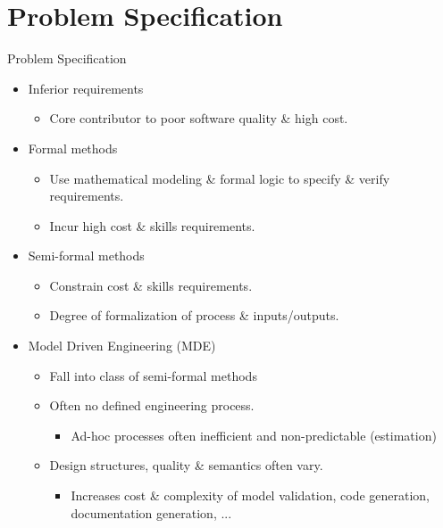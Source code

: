 \section{Problem Specification}

\begin{frame}{Problem Specification}
\initclock

  \begin{itemize}
    \item<alert@+> Inferior requirements
      \begin{itemize}
      	\item Core contributor to poor software quality \& high cost.
      \end{itemize}
    \item<alert@+> Formal methods
      \begin{itemize}
	      \item Use mathematical modeling \& formal logic to specify \& verify requirements.
    	  \item Incur high cost \& skills requirements.
      \end{itemize}
    \item<alert@+> Semi-formal methods
      \begin{itemize}
		\item Constrain cost \& skills requirements.
		\item Degree of formalization of process \& inputs/outputs.
	  \end{itemize}
   \item<alert@+> Model Driven Engineering (MDE)
   	  \begin{itemize}
   	  	\item Fall into class of semi-formal methods
		  \item Often no defined engineering process.
			 \begin{itemize}
			  \item Ad-hoc processes often inefficient and non-predictable (estimation)
			 \end{itemize}
		  \item Design structures, quality \& semantics often vary.
			 \begin{itemize}
			 \item Increases cost \& complexity of model validation, code generation, documentation generation, ...
		  \end{itemize}
	  \end{itemize}
  \end{itemize}

\end{frame}

